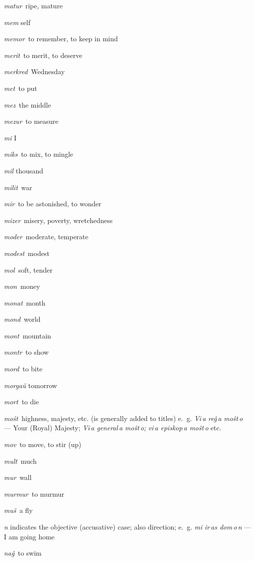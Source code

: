 \begin{landscape}
\begin{multicols}{5}
\begin{outdent}{1em}
\emph{matur\,} ripe, mature

\emph{mem} self

\emph{memor\,} to remember, to keep in mind

\emph{merit\,} to merit, to deserve

\emph{merkred\,} Wednesday

\emph{met\,} to put

\emph{mez\,} the middle

\emph{mezur\,} to measure

\emph{mi} I

\emph{miks\,} to mix, to mingle

\emph{mil} thousand

\emph{milit\,} war

\emph{mir\,} to be astonished, to wonder

\emph{mizer\,} misery, poverty, wretchedness

\emph{moder\,} moderate, temperate

\emph{modest\,} modest

\emph{mol\,} soft, tender

\emph{mon\,} money

\emph{monat\,} month

\emph{mond\,} world

\emph{mont\,} mountain

\emph{montr\,} to show

\emph{mord\,} to bite

\emph{morgaŭ} tomorrow

\emph{mort\,} to die

\emph{moŝt\,} highness, majesty, etc. (is generally added to titles) e.~g. \emph{Vi\,a reĝ\,a moŝt\,o} — Your (Royal) Majesty; \emph{Vi\,a general\,a moŝt\,o;} \emph{vi\,a episkop\,a moŝt\,o} etc.

\emph{mov\,} to move, to stir (up)

\emph{mult\,} much

\emph{mur\,} wall

\emph{murmur\,} to murmur

\emph{muŝ\,} a fly
\end{outdent}


\begin{outdent}{1em}
\emph{n} indicates the objective (accusative) case; also direction; e.~g. \emph{mi ir\,as dom\,o\,n} — I am going home

\emph{naĝ\,} to swim


\end{outdent}
\end{multicols}
\end{landscape}

